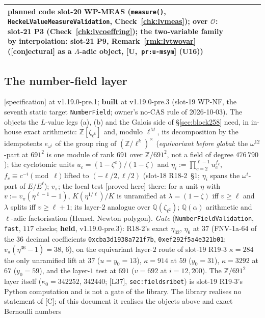 \documentclass[11pt]{article}
\theoremstyle{remark}
\newcommand{\Z}{\mathbb{Z}}
\newcommand{\Q}{\mathbb{Q}}
\newcommand{\PROVED}{\textsf{[proved here]}}
\newcommand{\CONJ}{\textsf{[conjectural]}}
\newcommand{\SPEC}{\textsf{[specification]}}           %
\newcommand{\Ucite}[1]{[U,~\texttt{#1}]}               %
\begin{document}
\begin{center}
\begin{longtable}{@{}>{\raggedright\arraybackslash}p{2.2cm}>{\raggedright\arraybackslash}p{3.2cm}>{\raggedright\arraybackslash}p{3.3cm}>{\raggedright\arraybackslash}p{3.0cm}>{\raggedright\arraybackslash}p{3.6cm}@{}}
  planned code slot-20 WP-MEAS (\texttt{measure()}, \texttt{HeckeLValueMeasureValidation}, Check~\ref{chk:lvmeas}); over $\mathcal O$: slot-21 P3 (Check~\ref{chk:lvcoeffring}); the two-variable
  family by interpolation: slot-21 P9, Remark~\ref{rmk:lvtwovar} (\CONJ{} as a $\Lambda$-adic object, \Ucite{pr:u-msym} (U16)) \\
\bottomrule
\end{longtable}
\end{center}

\subsection{The number-field layer}\label{sec:lvnf}
\SPEC{} at v1.19.0-pre.1; \textbf{built} at v1.19.0-pre.3 (slot-19 WP-NF, the seventh static target \texttt{NumberField}; owner's no-CAS rule of 2026-10-03). The objects the $L$-value legs (a), (b) and the Galois side of \S\ref{sec:block258} need, in in-house
exact arithmetic: $\Z[\zeta_{\ell^{k}}]$ and, modulo $\ell^{M}$, its decomposition by the idempotents $e_{\omega^{i}}$ of the group ring of $(\Z/\ell^{k})^{\times}$
(\emph{equivariant before global}: the $\omega^{12}$-part at $691^{2}$ is one module of rank $691$ over $\Z/691^{2}$, not a field of degree $476\,790$); the cyclotomic
units $u_c=(1-\zeta^{c})/(1-\zeta)$ and $\eta_i:=\prod_{c=2}^{\ell-1}u_c^{f_c}$, $f_c\equiv c^{-i}\pmod\ell$ lifted to $(-\ell/2,\ell/2)$ (slot-18 R18-2~\S1; $\eta_i$ spans the
$\omega^{i}$-part of $E/E^{\ell}$); $v_\pi$; the local test \PROVED{} there: for a unit $\eta$ with $v:=v_\pi(\eta^{\ell-1}-1)$, $K(\eta^{1/\ell})/K$ is unramified at
$\lambda=(1-\zeta)$ iff $v\ge\ell$ and $\lambda$ splits iff $v\ge\ell+1$; its layer-$2$ analogue over $\Q(\zeta_{\ell^{2}})$; $\Q(\alpha)$ arithmetic and $\ell$-adic
factorisation (Hensel, Newton polygon). \emph{Gate} (\texttt{NumberFieldValidation}, \texttt{fast}, $117$ checks; \textbf{held}, v1.19.0-pre.3): R18-2's exact $\eta_{32}$, $\eta_6$ at $37$ (FNV-1a-64 of the
$36$ decimal coefficients \texttt{0xcba3d1938a721f7b}, \texttt{0xef292f5a4e321b01}; $v_\pi(\eta^{36}-1)=38$, $6$), on the equivariant layer-$2$ route of slot-19 R19-3
$\kappa=284$ the only unramified lift at $37$ ($u=y_0=13$), $\kappa=914$ at $59$ ($y_0=31$), $\kappa=3292$ at $67$ ($y_0=59$), and the layer-$1$ test at $691$
($v=692$ at $i=12,200$). The $\Z/691^{2}$ layer itself ($\kappa_0=342252$, $342440$; [L37], \texttt{sec:fieldsribet}) is slot-19 R19-3's Python computation and is
not a gate of the library. The library realises no statement of [C]; of this document it realises the objects above and exact Bernoulli numbers
\end{document}
